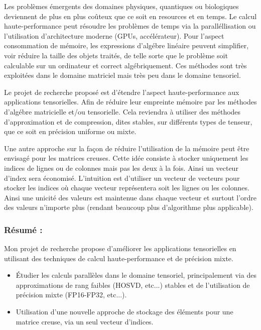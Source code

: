 Les problèmes émergents des domaines physiques, quantiques ou biologiques
deviennent de plus en plus coûteux que ce soit en resources et en temps. Le
calcul haute-performance peut résoudre les problèmes de temps via la
paralléllisation ou l'utilisation d'architecture moderne (GPUs, accélérateur).
Pour l'aspect consommation de mémoire, les expressions d'algébre linéaire
peuvent simplifier, voir réduire la taille des objets traités, de telle sorte
que le problème soit calculable sur un ordinateur et correct algébriquement.
Ces méthodes sont très exploitées dans le domaine matriciel mais très peu dans
le domaine tensoriel.

Le projet de recherche proposé est d'étendre l'aspect haute-performance aux
applications tensorielles. Afin de réduire leur empreinte mémoire par les
méthodes d'algébre matricielle et/ou tensorielle. Cela reviendra à utiliser des
méthodes d'approximation et de compression, dites stables, sur différents types
de tenseur, que ce soit en précision uniforme ou mixte.

Une autre approche sur la façon de réduire l'utilisation de la mémoire peut
être envisagé pour les matrices creuses. Cette idée consiste à stocker
uniquement les indices de lignes ou de colonnes mais pas les deux à la fois.
Ainsi un vecteur d'index sera économisé. L'intuition est d'utiliser un vecteur
de vecteurs pour stocker les indices où chaque vecteur représentera soit les
lignes ou les colonnes. Ainsi une unicité des valeurs est maintenue dans chaque
vecteur et surtout l'ordre des valeurs n'importe plus (rendant beaucoup plus
d'algorithme plus applicable).

\subsubsection*{Résumé :}

Mon projet de recherche propose d'améliorer les applications tensorielles en
utilisant des techniques de calcul haute-performance et de précision mixte.
\begin{itemize}
    \item[\textbf{Axe 1 :}] Étudier les calculs parallèles dans le domaine tensoriel, principalement via des approximations de rang faibles (HOSVD, etc...) stables et de l'utilisation de précision mixte (FP16-FP32, etc...).
    \item[\textbf{Axe 2 :}] Utilisation d'une nouvelle approche de stockage des éléments pour une matrice creuse, via un seul vecteur d'indices.
\end{itemize}

